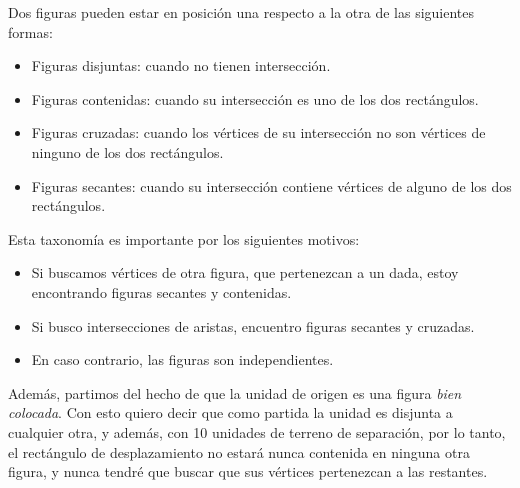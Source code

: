 Dos figuras pueden estar en posición una respecto a la otra de las
siguientes formas:
\begin{itemize}
\item Figuras disjuntas: cuando no tienen intersección.
\item Figuras contenidas: cuando su intersección es uno de los dos
  rectángulos.
\item Figuras cruzadas: cuando los vértices de su intersección no son
  vértices de ninguno de los dos rectángulos.
\item Figuras secantes: cuando su intersección contiene vértices
  de alguno de los dos rectángulos.
\end{itemize}

Esta taxonomía es importante por los siguientes motivos:
\begin{itemize}
\item Si buscamos vértices de otra figura, que pertenezcan a un
  dada, estoy encontrando figuras secantes y contenidas.
\item Si busco intersecciones de aristas, encuentro figuras secantes y cruzadas.
\item En caso contrario, las figuras son independientes.
\end{itemize}

Además, partimos del hecho de que la unidad de origen es una figura
\emph{bien colocada}. Con esto quiero decir que como partida la unidad
es disjunta a cualquier otra, y además, con 10 unidades de terreno de
separación, por lo tanto, el rectángulo de desplazamiento no estará
nunca contenida en ninguna otra figura, y nunca tendré que buscar que
sus vértices pertenezcan a las restantes.

